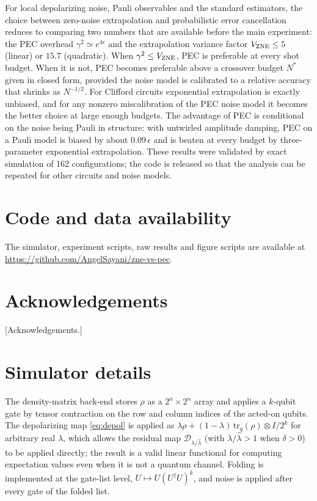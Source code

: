 \documentclass[aps,pra,reprint,amsmath,amssymb,nofootinbib,superscriptaddress]{revtex4-2}
\theoremstyle{remark}
\providecommand{\tr}{}\renewcommand{\tr}{\mathrm{tr}}
\newcommand{\eps}{\epsilon}
\begin{document}
For local depolarizing noise, Pauli observables and the standard estimators, the choice between zero-noise extrapolation and probabilistic error cancellation reduces to comparing two numbers that are available before the main experiment: the PEC overhead $\gamma^2\simeq e^{4\eps}$ and the extrapolation variance factor $V_{\rm ZNE}\le5$ (linear) or $15.7$ (quadratic). When $\gamma^2\le V_{\rm ZNE}$, PEC is preferable at every shot budget. When it is not, PEC becomes preferable above a crossover budget $N^*$ given in closed form, provided the noise model is calibrated to a relative accuracy that shrinks as $N^{-1/2}$. For Clifford circuits exponential extrapolation is exactly unbiased, and for any nonzero miscalibration of the PEC noise model it becomes the better choice at large enough budgets. The advantage of PEC is conditional on the noise being Pauli in structure: with untwirled amplitude damping, PEC on a Pauli model is biased by about $0.09\,\eps$ and is beaten at every budget by three-parameter exponential extrapolation. These results were validated by exact simulation of 162 configurations; the code is released so that the analysis can be repeated for other circuits and noise models.

\section*{Code and data availability}
The simulator, experiment scripts, raw results and figure scripts are available at \url{https://github.com/AngelSayani/zne-vs-pec}.

\section*{Acknowledgements}
[Acknowledgements.]

\appendix
\section{Simulator details}
\label{app:sim}
The density-matrix back-end stores $\rho$ as a $2^n\times2^n$ array and applies a $k$-qubit gate by tensor contraction on the row and column indices of the acted-on qubits. The depolarizing map \cref{eq:depol} is applied as $\lambda\rho+(1-\lambda)\,\tr_q(\rho)\otimes I/2^k$ for arbitrary real $\lambda$, which allows the residual map $\mathcal D_{\lambda/\hat\lambda}$ (with $\lambda/\hat\lambda>1$ when $\delta>0$) to be applied directly; the result is a valid linear functional for computing expectation values even when it is not a quantum channel. Folding is implemented at the gate-list level, $U\mapsto U(U^\dagger U)^k$, and noise is applied after every gate of the folded list.
\end{document}
